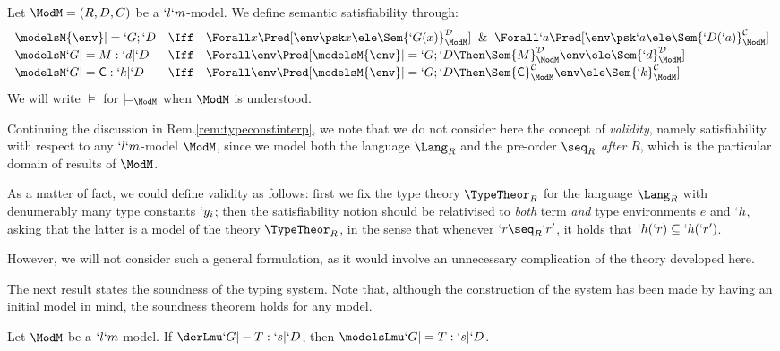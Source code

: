 \documentclass{lmcs}
\begin{document}
 \begin{defi}[Satisfiability] \label{def:judegmentSat}
Let ${\ModM} = (R,D,C)$ be a $`l`m$-model.
We define semantic satisfiability through:
%
 \[ \def\arraystretch{1.2} \begin{array}{lcl}
 \modelsM {\env} |= `G;`D 
	& \Iff& 
 \Forall x \Pred[ \env \psk x \ele \Sem{`G(x)}_{\ModM}^{\mathcal D } ] \And	
 \Forall `a \Pred[ \env \psk `a \ele \Sem{ `D(`a) }_{\ModM}^{\mathcal C} ] 
 \\ 
 \modelsM `G |= M : `d | `D 
	& \Iff &	
 \Forall \env \Pred[ \modelsM {\env} |= `G;`D 
	\Then \Sem{ M }_{\ModM}^{\mathcal D }{ \env } \ele \Sem{`d}_{\ModM}^{\mathcal D } ] 
 \\ 
 \modelsM `G |= {\Cmd} : `k | `D 
	& \Iff &
 \Forall \env \Pred[ \modelsM {\env} |= `G;`D 
	\Then \Sem{ \Cmd}_{\ModM}^{\mathcal C }{ \env } \ele \Sem{ `k }_{\ModM}^{\mathcal C} ] 
 \end{array} \]
We will write $\models$ for $\models_{\ModM}$ when $\ModM$ is understood.
 \end{defi}

 \begin{rem} \label{rem:validity}
Continuing the discussion in Rem.\skp\ref{rem:typeconstinterp}, we note that we do not consider here the concept of \emph{validity}, namely satisfiability with respect to any $`l`m$-model $\ModM$, since we model both the language $\Lang_R$ and the pre-order $\seq_R$ \emph{after} $R$, which is the particular domain of results of $\ModM$. 

As a matter of fact, we could define validity as follows: first we fix the type theory $\TypeTheor_R$ for the language $\Lang_R$ with denumerably many type constants $`y_i$; then the satisfiability notion should be relativised to \emph{both} term \emph{and} type environments $e$ and $`h$, asking that the latter is a model of the theory $\TypeTheor_R$, in the sense that whenever $`r \seq_R `r'$, it holds that $`h(`r) \subseteq `h(`r')$.

However, we will not consider such a general formulation, as it would involve an unnecessary complication of the theory developed here.
 \end{rem}

The next result states the soundness of the typing system. 
Note that, although the construction of the system has been made by having an initial model in mind, the soundness theorem holds for any model.

 \begin{thm} \label{thm:typeAssSound}
Let $\ModM$ be a $`l`m$-model. 
If $ \derLmu `G |- T : `s | `D $, then $ \modelsLmu `G |= T : `s | `D $.
 \end{thm}
\end{document}
